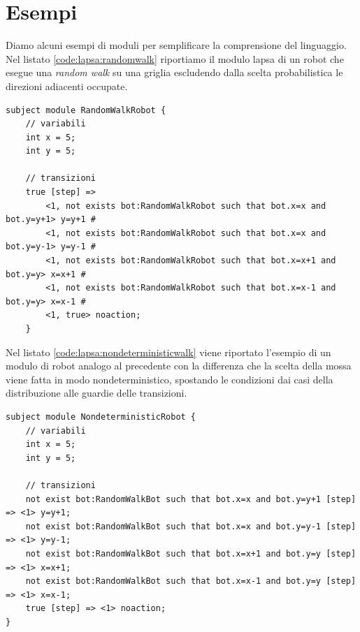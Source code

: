 \section{Esempi}
Diamo alcuni esempi di moduli per semplificare la comprensione del linguaggio.
Nel listato \ref{code:lapsa:randomwalk} riportiamo il modulo \ac{lapsa} di un robot che esegue una \emph{random walk} su una griglia escludendo dalla scelta probabilistica le direzioni adiacenti occupate.

\begin{lstlisting}[language=lapsa,style=eclipse,caption={Esempio di random walk in \acs{lapsa}},label=code:lapsa:randomwalk]
subject module RandomWalkRobot {
	// variabili
	int x = 5;
	int y = 5;
	
	// transizioni
	true [step] =>
		<1, not exists bot:RandomWalkRobot such that bot.x=x and bot.y=y+1> y=y+1 #
		<1, not exists bot:RandomWalkRobot such that bot.x=x and bot.y=y-1> y=y-1 # 
		<1, not exists bot:RandomWalkRobot such that bot.x=x+1 and bot.y=y> x=x+1 #
		<1, not exists bot:RandomWalkRobot such that bot.x=x-1 and bot.y=y> x=x-1 #
		<1, true> noaction;
	}
\end{lstlisting}

Nel listato \ref{code:lapsa:nondeterministicwalk} viene riportato l'esempio di un modulo di robot analogo al precedente con la differenza che la scelta della mossa viene fatta in modo nondeterministico, spostando le condizioni dai casi della distribuzione alle guardie delle transizioni.

\begin{lstlisting}[language=lapsa,style=eclipse,caption={Versione nondeterministica della random walk in \acs{lapsa}},label=code:lapsa:nondeterministicwalk]
subject module NondeterministicRobot {
	// variabili
	int x = 5;
	int y = 5;
	
	// transizioni
	not exist bot:RandomWalkBot such that bot.x=x and bot.y=y+1 [step] => <1> y=y+1;
	not exist bot:RandomWalkBot such that bot.x=x and bot.y=y-1 [step] => <1> y=y-1;
	not exist bot:RandomWalkBot such that bot.x=x+1 and bot.y=y [step] => <1> x=x+1;
	not exist bot:RandomWalkBot such that bot.x=x-1 and bot.y=y [step] => <1> x=x-1;
	true [step] => <1> noaction;
}
\end{lstlisting}

